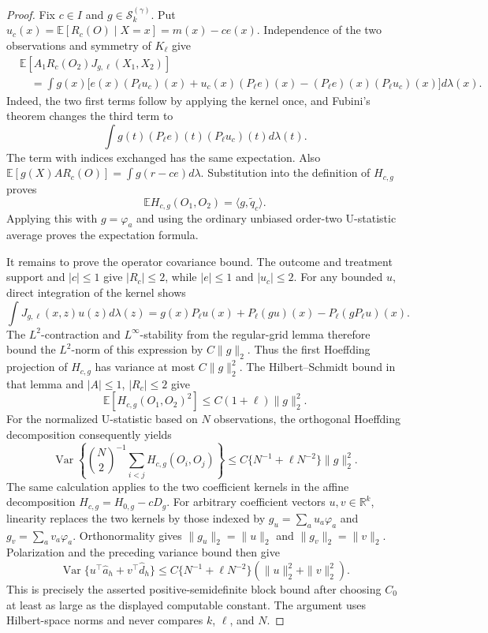 \documentclass{article}
\begin{document}
\begin{proof}
Fix \(c\in I\) and \(g\in\mathcal S_k^{(\gamma)}\).  Put \(u_c(x)=\mathbb E[R_c(O)\mid X=x]=m(x)-ce(x)\).  Independence of the two observations and symmetry of \(K_\ell\) give
\[
\begin{aligned}
 &\mathbb E[A_1R_c(O_2)J_{g,\ell}(X_1,X_2)]\\
 &\quad=\int g(x)\bigl[e(x)(P_\ell u_c)(x)
       +u_c(x)(P_\ell e)(x)
       -(P_\ell e)(x)(P_\ell u_c)(x)\bigr]d\lambda(x).
\end{aligned}
\]
Indeed, the two first terms follow by applying the kernel once, and Fubini's theorem changes the third term to
\[
 \int g(t)(P_\ell e)(t)(P_\ell u_c)(t)d\lambda(t).
\]
The term with indices exchanged has the same expectation.  Also \(\mathbb E[g(X)AR_c(O)]=\int g(r-ce)d\lambda\).  Substitution into the definition of \(H_{c,g}\) proves
\[
 \mathbb E H_{c,g}(O_1,O_2)=\langle g,\widetilde q_c\rangle.
\]
Applying this with \(g=\varphi_a\) and using the ordinary unbiased order-two U-statistic average proves the expectation formula.

It remains to prove the operator covariance bound.  The outcome and treatment support and \(|c|\le1\) give \(|R_c|\le2\), while \(|e|\le1\) and \(|u_c|\le2\).  For any bounded \(u\), direct integration of the kernel shows
\[
 \int J_{g,\ell}(x,z)u(z)d\lambda(z)
 =g(x)P_\ell u(x)+P_\ell(gu)(x)-P_\ell(gP_\ell u)(x).
\]
The \(L^2\)-contraction and \(L^\infty\)-stability from the regular-grid lemma therefore bound the \(L^2\)-norm of this expression by \(C\|g\|_2\).  Thus the first Hoeffding projection of \(H_{c,g}\) has variance at most \(C\|g\|_2^2\).  The Hilbert--Schmidt bound in that lemma and \(|A|\le1\), \(|R_c|\le2\) give
\[
 \mathbb E[H_{c,g}(O_1,O_2)^2]\le C(1+\ell)\|g\|_2^2.
\]
For the normalized U-statistic based on \(N\) observations, the orthogonal Hoeffding decomposition consequently yields
\[
 \operatorname{Var}\!\left\{\binom N2^{-1}\sum_{i<j}H_{c,g}(O_i,O_j)\right\}
 \le C\{N^{-1}+\ell N^{-2}\}\|g\|_2^2.
\]
The same calculation applies to the two coefficient kernels in the affine decomposition \(H_{c,g}=H_{0,g}-cD_g\).  For arbitrary coefficient vectors \(u,v\in\mathbb R^k\), linearity replaces the two kernels by those indexed by \(g_u=\sum_a u_a\varphi_a\) and \(g_v=\sum_a v_a\varphi_a\).  Orthonormality gives \(\|g_u\|_2=\|u\|_2\) and \(\|g_v\|_2=\|v\|_2\).  Polarization and the preceding variance bound then give
\[
 \operatorname{Var}\{u^\top\widehat a_h+v^\top\widehat d_h\}
 \le C\{N^{-1}+\ell N^{-2}\}(\|u\|_2^2+\|v\|_2^2).
\]
 This is precisely the asserted positive-semidefinite block bound after choosing \(C_0\) at least as large as the displayed computable constant.  The argument uses Hilbert-space norms and never compares \(k\), \(\ell\), and \(N\).
\end{proof}
\end{document}
